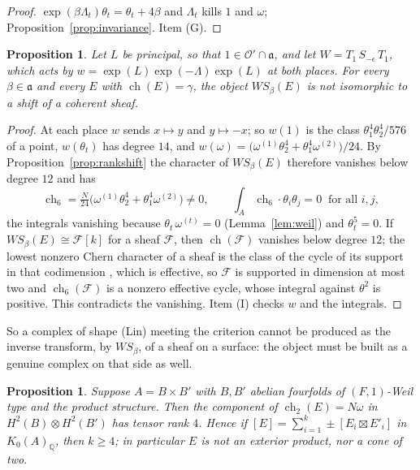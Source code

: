 \documentclass[11pt]{amsart}
\newtheorem{proposition}[theorem]{Proposition}
\theoremstyle{definition}
\theoremstyle{remark}
\newcommand{\QQ}{\mathbb{Q}}
\newcommand{\cO}{\mathcal{O}}
\newcommand{\fa}{\mathfrak{a}}
\newcommand{\ch}{\operatorname{ch}}
\begin{document}
\begin{proof}
$\exp(\beta\Lambda_{t})\theta_{t}=\theta_{t}+4\beta$ and $\Lambda_{t}$ kills
$1$ and $\omega$; Proposition~\ref{prop:invariance}. Item (G).
\end{proof}

\begin{proposition}\label{prop:notsheaf}
Let $L$ be principal, so that $1\in\cO'\cap\fa$, and let
$W=T_{1}\,S_{-\epsilon}\,T_{1}$, which acts by
$w=\exp(L)\exp(-\Lambda)\exp(L)$ at both places. For every $\beta\in\fa$
and every $E$ with $\ch(E)=\gamma$, the object $W S_{\beta}(E)$ is not
isomorphic to a shift of a coherent sheaf.
\end{proposition}

\begin{proof}
At each place $w$ sends $x\mapsto y$ and $y\mapsto-x$; so $w(1)$ is the
class $\theta_{1}^{4}\theta_{2}^{4}/576$ of a point, $w(\theta_{t})$ has
degree $14$, and $w(\omega)=\bigl(\omega^{(1)}\theta_{2}^{4}+
\theta_{1}^{4}\omega^{(2)}\bigr)/24$. By Proposition~\ref{prop:rankshift}
the character of $W S_{\beta}(E)$ therefore vanishes below degree $12$ and
has
\[
  \ch_{6}=\tfrac{N}{24}\bigl(\omega^{(1)}\theta_{2}^{4}+\theta_{1}^{4}\omega^{(2)}\bigr)
  \neq0,\qquad \int_{A}\ch_{6}\cdot\theta_{i}\theta_{j}=0\ \text{ for all }i,j,
\]
the integrals vanishing because $\theta_{t}\,\omega^{(t)}=0$
(Lemma~\ref{lem:weil}) and $\theta_{t}^{5}=0$. If $W S_{\beta}(E)\cong
\mathcal{F}[k]$ for a sheaf $\mathcal{F}$, then $\ch(\mathcal{F})$ vanishes
below degree $12$; the lowest nonzero Chern character of a sheaf is the
class of the cycle of its support in that codimension
\cite[\S15.1, Ex.~15.1.5 and Cor.~18.3.2]{Ful98}, which is effective, so $\mathcal{F}$ is
supported in dimension at most two and $\ch_{6}(\mathcal{F})$ is a nonzero
effective cycle, whose integral against $\theta^{2}$ is positive. This
contradicts the vanishing. Item (I) checks $w$ and the integrals.
\end{proof}

So a complex of shape (Lin) meeting the criterion cannot be produced as the
inverse transform, by $WS_{\beta}$, of a sheaf on a surface: the object must
be built as a genuine complex on that side as well.

\begin{proposition}\label{prop:product}
Suppose $A=B\times B'$ with $B,B'$ abelian fourfolds of $(F,1)$-Weil type and
the product structure. Then the component of $\ch_{2}(E)=N\omega$ in
$H^{2}(B)\otimes H^{2}(B')$ has tensor rank $4$. Hence if
$[E]=\sum_{i=1}^{k}\pm[E_{i}\boxtimes E'_{i}]$ in $K_{0}(A)_{\QQ}$, then
$k\ge4$; in particular $E$ is not an exterior product, nor a cone of two.
\end{proposition}
\end{document}
